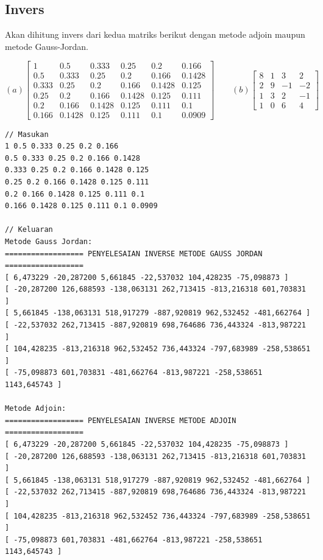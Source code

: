 \subsection{Invers}

Akan dihitung invers dari kedua matriks berikut dengan metode adjoin maupun metode Gauss-Jordan.

\[(a) \begin{bmatrix}
1     & 0.5    & 0.333  & 0.25   & 0.2    & 0.166 \\
0.5   & 0.333  & 0.25   & 0.2    & 0.166  & 0.1428 \\
0.333 & 0.25   & 0.2    & 0.166  & 0.1428 & 0.125 \\
0.25  & 0.2    & 0.166  & 0.1428 & 0.125  & 0.111 \\
0.2   & 0.166  & 0.1428 & 0.125  & 0.111  & 0.1 \\
0.166 & 0.1428 & 0.125  & 0.111  & 0.1    & 0.0909 
\end{bmatrix} \qquad (b)
\begin{bmatrix}
8  & 1 & 3  & 2 \\
2  & 9 & -1 &  -2 \\
1  & 3 & 2  & -1 \\
1  & 0 & 6  & 4 
\end{bmatrix}
\]

\begin{lstlisting}[caption = Inverse]
// Masukan
1 0.5 0.333 0.25 0.2 0.166
0.5 0.333 0.25 0.2 0.166 0.1428
0.333 0.25 0.2 0.166 0.1428 0.125
0.25 0.2 0.166 0.1428 0.125 0.111
0.2 0.166 0.1428 0.125 0.111 0.1
0.166 0.1428 0.125 0.111 0.1 0.0909

// Keluaran
Metode Gauss Jordan:
================== PENYELESAIAN INVERSE METODE GAUSS JORDAN ==================
[ 6,473229 -20,287200 5,661845 -22,537032 104,428235 -75,098873 ]
[ -20,287200 126,688593 -138,063131 262,713415 -813,216318 601,703831 ]
[ 5,661845 -138,063131 518,917279 -887,920819 962,532452 -481,662764 ]
[ -22,537032 262,713415 -887,920819 698,764686 736,443324 -813,987221 ]
[ 104,428235 -813,216318 962,532452 736,443324 -797,683989 -258,538651 ]
[ -75,098873 601,703831 -481,662764 -813,987221 -258,538651 1143,645743 ]

Metode Adjoin:
================== PENYELESAIAN INVERSE METODE ADJOIN ==================
[ 6,473229 -20,287200 5,661845 -22,537032 104,428235 -75,098873 ]
[ -20,287200 126,688593 -138,063131 262,713415 -813,216318 601,703831 ]
[ 5,661845 -138,063131 518,917279 -887,920819 962,532452 -481,662764 ]
[ -22,537032 262,713415 -887,920819 698,764686 736,443324 -813,987221 ]
[ 104,428235 -813,216318 962,532452 736,443324 -797,683989 -258,538651 ]
[ -75,098873 601,703831 -481,662764 -813,987221 -258,538651 1143,645743 ]
\end{lstlisting}

